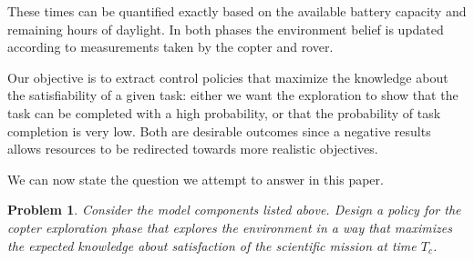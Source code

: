 \documentclass[conference]{IEEEtran}
\newtheorem{problem}{Problem}
\begin{document}
These times can be quantified exactly based on the available battery capacity and remaining hours of daylight. In both phases the environment belief is updated according to measurements taken by the copter and rover.  \\

 
  Our objective is to extract control policies that maximize the knowledge about the satisfiability of a given task: either we want the exploration to show that the task can be completed with a high probability, or that the probability of task completion is very low. Both are desirable outcomes since a negative results allows resources to be redirected towards more realistic objectives. 
  
We can now state the question we attempt to answer in this paper.
\begin{problem}
\label{prob:main}
  Consider the model components listed above. Design a policy for the copter exploration phase that explores the environment in a way that maximizes the expected knowledge about satisfaction of the scientific mission at time $T_c$.
\end{problem}



\end{document}
